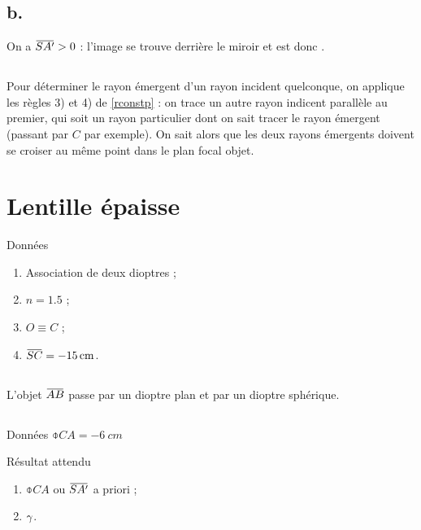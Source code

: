 \documentclass[10pt,a5paper,notitlepage]{book}
\begin{document}
\setcounter{subsection}{1}
\subsection{b.}
On a $\SAp > 0$ : l'image se trouve derrière le miroir et est donc
.

\subsection{}
Pour déterminer le rayon émergent d'un rayon incident quelconque, on applique
les règles 3) et 4) de \ref{rconstp} : on trace un autre rayon indicent
parallèle au premier, qui soit un rayon particulier dont on sait tracer le rayon
émergent (passant par $C$ par exemple). On sait alors que les deux rayons
émergents doivent se croiser au même point dans le plan focal objet.

\section{Lentille épaisse}
\begin{NCdefi}{Données}
    \begin{enumerate}
        \item Association de deux dioptres ;
        \item $n = 1.5$ ;
        \item $O \equiv C$ ;
        \item $\SC = \SI{-15}{cm}$.
    \end{enumerate}
\end{NCdefi}

\subsection{}
L'objet $\ABb$ passe par un dioptre plan et par un dioptre sphérique.

\subsection{}
\begin{NCdefi}{Données}
    $\obar{CA} = \SI{-6}{cm}$
\end{NCdefi}

\begin{NCprop}{Résultat attendu}
    \begin{enumerate}
        \item $\obar{CA}$ ou $\SAp$ a priori ;
        \item $\gamma$.
    \end{enumerate}
\end{NCprop}
\end{document}
